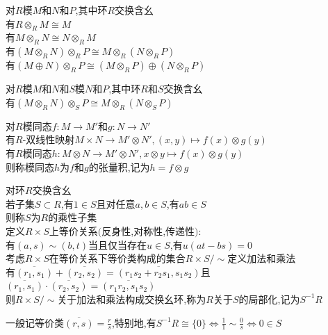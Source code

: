 \begin{dingli}
对$R$模$M$和$N$和$P$,其中环$R$交换含幺\\
有$R\otimes_{R}M\cong M$\\
有$M\otimes_{R}N\cong N\otimes_{R}M$\\
有$(M\otimes_{R}N)\otimes_{R}P\cong M\otimes_{R}(N\otimes_{R}P)$\\
有$(M\oplus N)\otimes_{R} P\cong (M\otimes_{R}P)\oplus(N\otimes_{R}P)$
\end{dingli}

\begin{dingli}
对$R$模$M$和$N$和$S$模$N$和$P$,其中环$R$和$S$交换含幺\\
有$(M\otimes_{R}N)\otimes_{S}P\cong M\otimes_{R}(N\otimes_{S}P)$
\end{dingli}

\begin{dingyi}
对$R$模同态$f:M\to M'$和$g:N\to N'$\\
有$R$-双线性映射$M\times N\to M'\otimes N',(x,y)\mapsto f(x)\otimes g(y)$\\
有$R$模同态$h:M\otimes N\to M'\otimes N',x\otimes y\mapsto f(x)\otimes g(y)$\\
则称模同态$h$为$f$和$g$的张量积,记为$h=f\otimes g$
\end{dingyi}

\begin{dingyi}
对环$R$交换含幺\\
若子集$S\subset R$,有$1\in S$且对任意$a,b\in S$,有$ab\in S$\\
则称$S$为$R$的乘性子集\\
定义$R\times S$上等价关系$($反身性,对称性,传递性$)$:\\
有$(a,s)\sim (b,t)$当且仅当存在$u\in S$,有$u(at-bs)=0$\\
考虑$R\times S$在等价关系下等价类构成的集合$R\times S/\sim$定义加法和乘法\\
有$\overline{(r_1,s_1)}+\overline{(r_2,s_2)}=\overline{(r_1s_2+r_2s_1,s_1s_2)}$且$\overline{(r_1,s_1)}\cdot \overline{(r_2,s_2)}=\overline{(r_1r_2,s_1s_2)}$\\
则$R\times S/\sim$关于加法和乘法构成交换幺环,称为$R$关于$S$的局部化,记为$S^{-1}R$
\end{dingyi}

\begin{zhu}
一般记等价类$\overline{(r,s)}=\frac{r}{s}$,特别地,有$S^{-1}R\cong\{0\}$$\Leftrightarrow$$\frac{1}{1}\sim \frac{0}{s}$$\Leftrightarrow$$0\in S$
\end{zhu}

